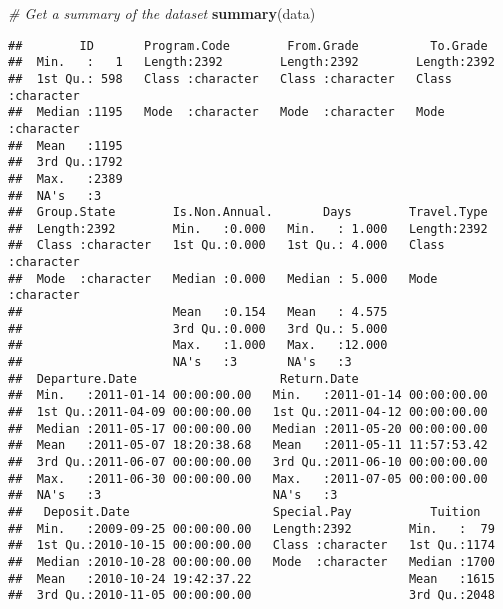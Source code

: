 \documentclass[
]{article}
\newenvironment{Shaded}{\begin{snugshade}}{\end{snugshade}}
\newcommand{\CommentTok}[1]{\textcolor[rgb]{0.56,0.35,0.01}{\textit{#1}}}
\newcommand{\FunctionTok}[1]{\textcolor[rgb]{0.13,0.29,0.53}{\textbf{#1}}}
\newcommand{\NormalTok}[1]{#1}
\begin{document}
\begin{Shaded}
\begin{Highlighting}[]
\CommentTok{\# Get a summary of the dataset}
\FunctionTok{summary}\NormalTok{(data)}
\end{Highlighting}
\end{Shaded}

\begin{verbatim}
##        ID       Program.Code        From.Grade          To.Grade        
##  Min.   :   1   Length:2392        Length:2392        Length:2392       
##  1st Qu.: 598   Class :character   Class :character   Class :character  
##  Median :1195   Mode  :character   Mode  :character   Mode  :character  
##  Mean   :1195                                                           
##  3rd Qu.:1792                                                           
##  Max.   :2389                                                           
##  NA's   :3                                                              
##  Group.State        Is.Non.Annual.       Days        Travel.Type       
##  Length:2392        Min.   :0.000   Min.   : 1.000   Length:2392       
##  Class :character   1st Qu.:0.000   1st Qu.: 4.000   Class :character  
##  Mode  :character   Median :0.000   Median : 5.000   Mode  :character  
##                     Mean   :0.154   Mean   : 4.575                     
##                     3rd Qu.:0.000   3rd Qu.: 5.000                     
##                     Max.   :1.000   Max.   :12.000                     
##                     NA's   :3       NA's   :3                          
##  Departure.Date                    Return.Date                    
##  Min.   :2011-01-14 00:00:00.00   Min.   :2011-01-14 00:00:00.00  
##  1st Qu.:2011-04-09 00:00:00.00   1st Qu.:2011-04-12 00:00:00.00  
##  Median :2011-05-17 00:00:00.00   Median :2011-05-20 00:00:00.00  
##  Mean   :2011-05-07 18:20:38.68   Mean   :2011-05-11 11:57:53.42  
##  3rd Qu.:2011-06-07 00:00:00.00   3rd Qu.:2011-06-10 00:00:00.00  
##  Max.   :2011-06-30 00:00:00.00   Max.   :2011-07-05 00:00:00.00  
##  NA's   :3                        NA's   :3                       
##   Deposit.Date                    Special.Pay           Tuition    
##  Min.   :2009-09-25 00:00:00.00   Length:2392        Min.   :  79  
##  1st Qu.:2010-10-15 00:00:00.00   Class :character   1st Qu.:1174  
##  Median :2010-10-28 00:00:00.00   Mode  :character   Median :1700  
##  Mean   :2010-10-24 19:42:37.22                      Mean   :1615  
##  3rd Qu.:2010-11-05 00:00:00.00                      3rd Qu.:2048  

\end{verbatim}
\end{document}
